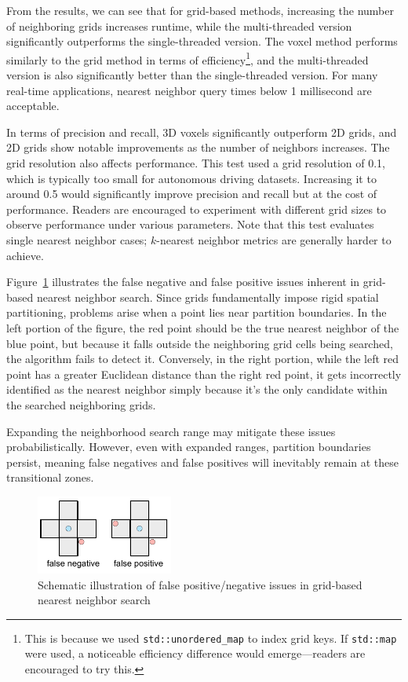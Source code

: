 From the results, we can see that for grid-based methods, increasing the number of neighboring grids increases runtime, while the multi-threaded version significantly outperforms the single-threaded version. The voxel method performs similarly to the grid method in terms of efficiency\footnote{This is because we used \texttt{std::unordered\_map} to index grid keys. If \texttt{std::map} were used, a noticeable efficiency difference would emerge—readers are encouraged to try this.}, and the multi-threaded version is also significantly better than the single-threaded version. For many real-time applications, nearest neighbor query times below 1 millisecond are acceptable.

In terms of precision and recall, 3D voxels significantly outperform 2D grids, and 2D grids show notable improvements as the number of neighbors increases. The grid resolution also affects performance. This test used a grid resolution of 0.1, which is typically too small for autonomous driving datasets. Increasing it to around 0.5 would significantly improve precision and recall but at the cost of performance. Readers are encouraged to experiment with different grid sizes to observe performance under various parameters. Note that this test evaluates single nearest neighbor cases; \(k\)-nearest neighbor metrics are generally harder to achieve.

Figure~\ref{fig:grid-bad-cases} illustrates the false negative and false positive issues inherent in grid-based nearest neighbor search. Since grids fundamentally impose rigid spatial partitioning, problems arise when a point lies near partition boundaries. In the left portion of the figure, the red point should be the true nearest neighbor of the blue point, but because it falls outside the neighboring grid cells being searched, the algorithm fails to detect it. Conversely, in the right portion, while the left red point has a greater Euclidean distance than the right red point, it gets incorrectly identified as the nearest neighbor simply because it's the only candidate within the searched neighboring grids. 

Expanding the neighborhood search range may mitigate these issues probabilistically. However, even with expanded ranges, partition boundaries persist, meaning false negatives and false positives will inevitably remain at these transitional zones.

\begin{figure}[!htp]
	\centering
	\includegraphics[width=0.4\textwidth]{resources/basic-point-cloud/grid-bad-cases.pdf}
	\caption{Schematic illustration of false positive/negative issues in grid-based nearest neighbor search}
	\label{fig:grid-bad-cases}
\end{figure}

